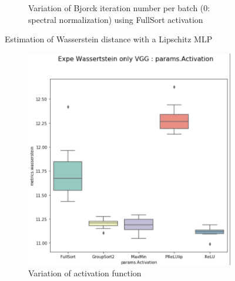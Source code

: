\begin{figure}
\begin{subfigure}{.5\textwidth}
  \caption{Variation of Bjorck iteration number per batch (0: spectral normalization) using FullSort activation}
  \label{fig:sub2}
\end{subfigure}
\caption{Estimation of Wasserstein distance with a Lipschitz MLP}
\label{fig:wass_estimation_mlp}
\end{figure}

\begin{figure}
\centering
\begin{subfigure}{.5\textwidth}
  \centering
  \includegraphics[width=1\linewidth]{img/Wassertein_estimation_VGG_activation_param.png}
  \caption{Variation of activation function}
  \label{fig:act_sub1}
\end{subfigure}%
\begin{subfigure}{.5\textwidth}
  \centering

\end{subfigure}
\end{figure}
